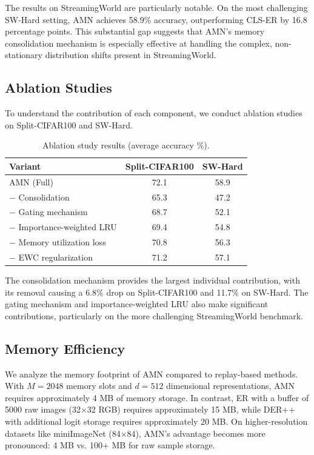 \documentclass[11pt]{article}
\begin{document}
The results on StreamingWorld are particularly notable. On the most challenging SW-Hard setting, AMN achieves 58.9\% accuracy, outperforming CLS-ER by 16.8 percentage points. This substantial gap suggests that AMN's memory consolidation mechanism is especially effective at handling the complex, non-stationary distribution shifts present in StreamingWorld.

\subsection{Ablation Studies}

To understand the contribution of each component, we conduct ablation studies on Split-CIFAR100 and SW-Hard.

\begin{table}[h]
\centering
\caption{Ablation study results (average accuracy \%).}
\label{tab:ablation}
\begin{tabular}{lcc}
\hline
Variant & Split-CIFAR100 & SW-Hard \\
\hline
AMN (Full) & 72.1 & 58.9 \\
$-$ Consolidation & 65.3 & 47.2 \\
$-$ Gating mechanism & 68.7 & 52.1 \\
$-$ Importance-weighted LRU & 69.4 & 54.8 \\
$-$ Memory utilization loss & 70.8 & 56.3 \\
$-$ EWC regularization & 71.2 & 57.1 \\
\hline
\end{tabular}
\end{table}

The consolidation mechanism provides the largest individual contribution, with its removal causing a 6.8\% drop on Split-CIFAR100 and 11.7\% on SW-Hard. The gating mechanism and importance-weighted LRU also make significant contributions, particularly on the more challenging StreamingWorld benchmark.

\subsection{Memory Efficiency}

We analyze the memory footprint of AMN compared to replay-based methods. With $M = 2048$ memory slots and $d = 512$ dimensional representations, AMN requires approximately 4 MB of memory storage. In contrast, ER with a buffer of 5000 raw images (32$\times$32 RGB) requires approximately 15 MB, while DER++ with additional logit storage requires approximately 20 MB. On higher-resolution datasets like miniImageNet (84$\times$84), AMN's advantage becomes more pronounced: 4 MB vs. 100+ MB for raw sample storage.
\end{document}
